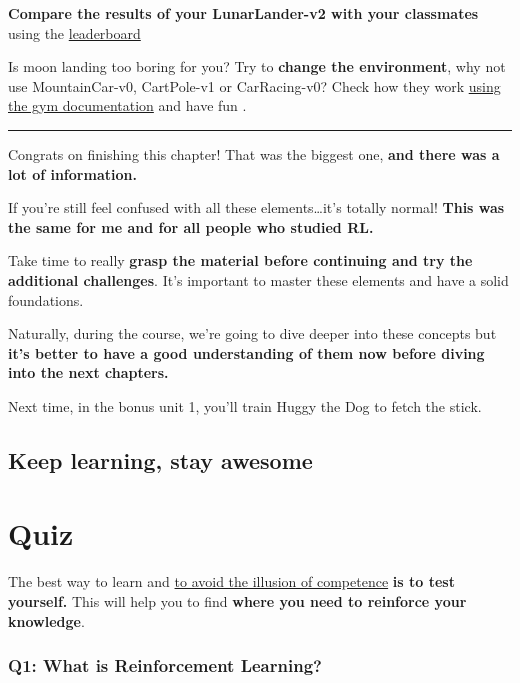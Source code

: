 \documentclass[11pt,a4paper]{article}
\begin{document}
\textbf{Compare the results of your LunarLander-v2 with your classmates} using the \href{https://huggingface.co/spaces/huggingface-projects/Deep-Reinforcement-Learning-Leaderboard}{leaderboard}

Is moon landing too boring for you? Try to \textbf{change the environment}, why not use MountainCar-v0, CartPole-v1 or CarRacing-v0? Check how they work \href{https://www.gymlibrary.dev/}{using the gym documentation} and have fun .

\begin{center}\rule{0.5\linewidth}{0.5pt}\end{center}

Congrats on finishing this chapter! That was the biggest one, \textbf{and there was a lot of information.}

If you're still feel confused with all these elements\ldots it's totally normal! \textbf{This was the same for me and for all people who studied RL.}

Take time to really \textbf{grasp the material before continuing and try the additional challenges}. It's important to master these elements and have a solid foundations.

Naturally, during the course, we're going to dive deeper into these concepts but \textbf{it's better to have a good understanding of them now before diving into the next chapters.}

Next time, in the bonus unit 1, you'll train Huggy the Dog to fetch the stick.


\subsection{Keep learning, stay awesome}\label{keep-learning-stay-awesome}

\section{Quiz}\label{quiz}

The best way to learn and \href{https://www.coursera.org/lecture/learning-how-to-learn/illusions-of-competence-BuFzf}{to avoid the illusion of competence} \textbf{is to test yourself.} This will help you to find \textbf{where you need to reinforce your knowledge}.

\subsubsection{Q1: What is Reinforcement Learning?}\label{q1-what-is-reinforcement-learning}
\end{document}
